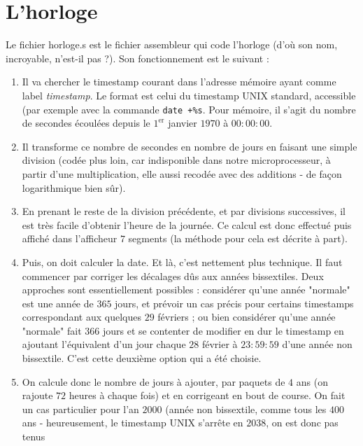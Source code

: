 \documentclass[13pt]{article}
\begin{document}
\section{L'horloge}

Le fichier horloge.s est le fichier assembleur qui code l'horloge (d'où son nom,
incroyable, n'est-il pas ?). Son fonctionnement est le suivant :

\begin{enumerate}
\item Il va chercher le timestamp courant dans l'adresse mémoire ayant comme label
   \emph{timestamp}. Le format est celui du timestamp UNIX standard, accessible (par
   exemple avec la commande \texttt{date +\%s}. Pour mémoire, il s'agit du nombre de
   secondes écoulées depuis le $1^{\text{er}}$ janvier $1970$ à $00:00:00$.\\
\item Il transforme ce nombre de secondes en nombre de jours en faisant une simple
   division (codée plus loin, car indisponible dans notre microprocesseur, à
   partir d'une multiplication, elle aussi recodée avec des additions - de façon
   logarithmique bien sûr).\\
\item En prenant le reste de la division précédente, et par divisions successives,
   il est très facile d'obtenir l'heure de la journée. Ce calcul est donc
   effectué puis affiché dans l'afficheur $7$ segments (la méthode pour cela est
   décrite à part).\\
\item Puis, on doit calculer la date. Et là, c'est nettement plus technique. Il
   faut commencer par corriger les décalages dûs aux années bissextiles. Deux
   approches sont essentiellement possibles : considérer qu'une année "normale"
   est une année de $365$ jours, et prévoir un cas précis pour certains timestamps
   correspondant aux quelques $29$ févriers ; ou bien considérer qu'une année
   "normale" fait $366$ jours et se contenter de modifier en dur le timestamp en
   ajoutant l'équivalent d'un jour chaque $28$ février à $23:59:59$ d'une année non
   bissextile. C'est cette deuxième option qui a été choisie.\\
\item On calcule donc le nombre de jours à ajouter, par paquets de $4$ ans (on
   rajoute $72$ heures à chaque fois) et en corrigeant en bout de course. On fait
   un cas particulier pour l'an $2000$ (année non bissextile, comme tous les $400$
   ans - heureusement, le timestamp UNIX s'arrête en $2038$, on est donc pas tenus

\end{enumerate}
\end{document}

